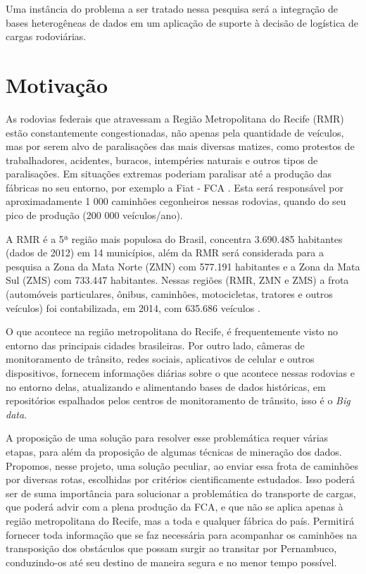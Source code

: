 Uma instância do problema a ser tratado nessa pesquisa será a integração de bases heterogêneas de dados em um aplicação de suporte à decisão de logística de cargas rodoviárias.


\section{ Motivação}\label{intro:motivacao}

As rodovias federais que atravessam a Região Metropolitana do Recife (RMR) estão constantemente congestionadas, não apenas pela 
quantidade de veículos, mas por serem alvo de paralisações das mais diversas matizes, como protestos de trabalhadores, acidentes, 
buracos, intempéries naturais e outros tipos de paralisações. 
Em situações extremas poderiam paralisar até a produção das fábricas no seu entorno, por exemplo a Fiat - FCA \cite{BNDES2013}. 
Esta será responsável por aproximadamente 1 000 caminhões cegonheiros nessas rodovias, quando do seu pico de produção (200 000 veículos/ano).

A RMR é a 5ª região mais populosa do Brasil, concentra 3.690.485 habitantes (dados de 2012) \cite{Bitoun2012} em 14 municípios, além da RMR 
será considerada para a pesquisa a Zona da Mata Norte (ZMN) com 577.191 habitantes e a Zona da Mata Sul (ZMS) com 733.447 habitantes. 
Nessas regiões (RMR, ZMN e ZMS) a frota (automóveis particulares, ônibus, caminhões, motocicletas, tratores e outros veículos) 
foi contabilizada, em 2014, com 635.686 veículos \cite{FrotaVeiculosIBGE}.

O que acontece na região metropolitana do Recife, é frequentemente visto no entorno das principais cidades brasileiras.
Por outro lado, câmeras de monitoramento de trânsito, redes sociais, aplicativos de celular e outros dispositivos, fornecem informações diárias sobre o que acontece nessas 
rodovias e no entorno delas, atualizando e alimentando bases de dados históricas, em repositórios espalhados pelos centros de monitoramento de trânsito, isso é o \textit{Big data}.

A proposição de uma solução para resolver esse problemática requer várias etapas, para além da proposição de algumas técnicas de mineração dos dados.
Propomos, nesse projeto, uma solução peculiar, ao enviar essa frota de caminhões por diversas rotas, escolhidas por critérios cientificamente estudados.
Isso poderá ser de suma importância para solucionar a problemática do transporte de cargas, que poderá advir com a plena produção da FCA, e que não se aplica apenas 
à região metropolitana do Recife, mas a toda e qualquer fábrica do país. Permitirá fornecer toda informação que se faz necessária para acompanhar os
caminhões na transposição dos obstáculos que possam surgir ao transitar por Pernambuco, conduzindo-os até seu destino de maneira segura e no menor tempo possível.


